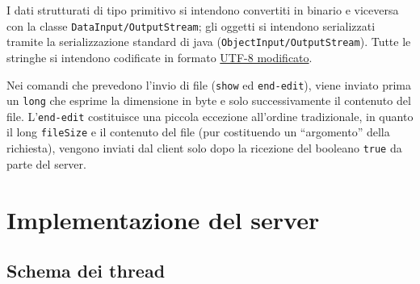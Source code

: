 \documentclass[a4paper,12pt]{article}
\begin{document}
 I dati strutturati di tipo primitivo si intendono convertiti in binario e viceversa con la classe \texttt{DataInput/OutputStream}; gli oggetti si intendono serializzati tramite la serializzazione standard di java (\texttt{ObjectInput/OutputStream}). Tutte le stringhe si intendono codificate in formato \href{https://docs.oracle.com/javase/7/docs/api/java/io/DataInput.html#modified-utf-8}{UTF-8 modificato}.
 
 Nei comandi che prevedono l'invio di file (\texttt{show} ed \texttt{end-edit}), viene inviato prima un \texttt{long} che esprime la dimensione in byte e solo successivamente il contenuto del file. L'\texttt{end-edit} costituisce una piccola eccezione all'ordine tradizionale, in quanto il long \texttt{fileSize} e il contenuto del file (pur costituendo un ``argomento'' della richiesta), vengono inviati dal client solo dopo la ricezione del booleano \texttt{true} da parte del server.

 \section{ Implementazione del server }
 
 \subsection{ Schema dei thread }
 
\end{document}
